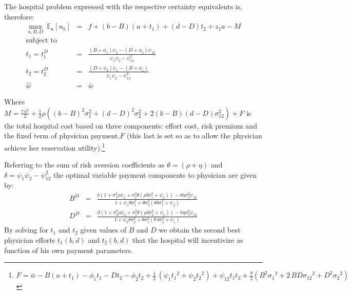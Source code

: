 \documentclass[12pt,letterpaper]{article}
\begin{document}
The hospital problem expressed with the respective certainty equivalents is, therefore:
\begin{eqnarray*}
\max\limits_{a,B,D}\ \mathbb{E}_{\mathbold{\epsilon}}[u_h]&=&
f+ \left( b-B \right)  \left( a+t_{{1}} \right) + \left( d-D \right) t_{{2}}+z_{{1}}a-M\\
\nonumber \text{subject to }&&\\
t_1=t_1^{D}&=&\frac{(B+\phi_1)\psi_2-(D+\phi_2)\psi_{12}}{\psi_1\psi_2-\psi_{12}^2}\\
t_2=t_2^{D}&=&\frac {\left( D+\phi_{{2}} \right) \psi_{{1}}- \left( B+\phi _{{1}} \right)}{\psi_1\psi_2-\psi_{12}^2}\\
\hat{w}&=&\bar{w}
\end{eqnarray*}

Where  $M=\frac{\tau\,{a}^{2}}{2}+\frac{1}{2}\rho\left((b-B)^2\sigma_1^2+(d-D)^2\sigma_2^2+2(b-B)(d-D)\sigma_{12}^2
 \right)+F$ is the total hospital cost based on three components: effort cost, risk premium and the fixed term of physician payment,$F$ (this last is set so as to allow the physician achieve her reservation utility).\footnote{$F=\bar{w}-B \left( a+t_{{1}} \right) -\phi_{{1}}t_{{1}}- Dt_{{2}}-\phi_{{2}}t_{{2}}+\frac{1}{2}\,\left(\psi_{{1}}{t_{{1}}}^{2}+\psi_{{2}}{t_{{2}}}^{2}\right)
 +\psi_{{12}}t_{{1}}t_{{2}}+\frac{\eta}{2}\left( {B}^{2}{\sigma_{{1}}}^{2}+2\,BD{\sigma_{{12}}}^{2}+{D}
^{2}{\sigma_{{2}}}^{2} \right)$}

Referring to the sum of risk aversion coefficients as $\theta=(\rho + \eta)$ and $\delta={\psi_1\psi_2-\psi_{12}^2}$ the optimal variable payment components to physician are given by:
\begin{eqnarray*}
B^D&=&\frac{b(1+\sigma_1^2\rho\psi_1+\sigma_2^2\theta(\rho\delta\sigma_1^2+\psi_2))-d\eta\sigma_2^2\psi_{12}}{1+\psi_1
\theta\sigma_1^2+\theta\sigma_2^2\left(\theta\delta\sigma_1^2+\psi_2\right)}\\
D^D&=&\frac{d(1+\sigma_2^2\rho\psi_2+\sigma_1^2\theta(\rho\delta\sigma_2^2+\psi_1))-b\eta\sigma_2^2\psi_{12}}{1+\psi_2
\theta\sigma_2^2+\theta\sigma_1^2\left( \theta\,\delta\sigma_2^2+\psi_1\right)}
\end{eqnarray*}
By solving for $t_1$ and $t_2$ given values of $B$ and $D$ we obtain the second best physician efforts $t_1(b,d)$ and $t_2(b,d)$ that the hospital will incentivize as function of his own payment parameters.
\end{document}
